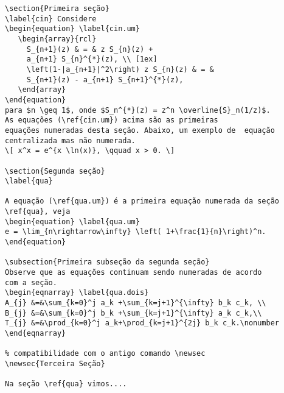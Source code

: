 \documentclass{TEMA}
\begin{document}
\begin{framed}
\begin{minipage}{10cm}
\setcounter{section}{0}
\begin{verbatim}
\section{Primeira seção}
\label{cin} Considere
\begin{equation} \label{cin.um}
   \begin{array}{rcl}
     S_{n+1}(z) & = & z S_{n}(z) +
     a_{n+1} S_{n}^{*}(z), \\ [1ex]
     \left(1-|a_{n+1}|^2\right) z S_{n}(z) & = &
     S_{n+1}(z) - a_{n+1} S_{n+1}^{*}(z),
   \end{array} 
\end{equation}
para $n \geq 1$, onde $S_n^{*}(z) = z^n \overline{S}_n(1/z)$.
As equações (\ref{cin.um}) acima são as primeiras
equações numeradas desta seção. Abaixo, um exemplo de  equação
centralizada mas não numerada.
\[ x^x = e^{x \ln(x)}, \qquad x > 0. \]

\section{Segunda seção}
\label{qua}

A equação (\ref{qua.um}) é a primeira equação numerada da seção
\ref{qua}, veja
\begin{equation} \label{qua.um}
e = \lim_{n\rightarrow\infty} \left( 1+\frac{1}{n}\right)^n.
\end{equation}

\subsection{Primeira subseção da segunda seção} 
Observe que as equações continuam sendo numeradas de acordo
com a seção.
\begin{eqnarray} \label{qua.dois}
A_{j} &=&\sum_{k=0}^j a_k +\sum_{k=j+1}^{\infty} b_k c_k, \\
B_{j} &=&\sum_{k=0}^j b_k +\sum_{k=j+1}^{\infty} a_k c_k,\\
T_{j} &=&\prod_{k=0}^j a_k+\prod_{k=j+1}^{2j} b_k c_k.\nonumber
\end{eqnarray}

% compatibilidade com o antigo comando \newsec
\newsec{Terceira Seção} 

Na seção \ref{qua} vimos....
\end{verbatim}
\end{minipage}
\end{framed}
\end{document}

